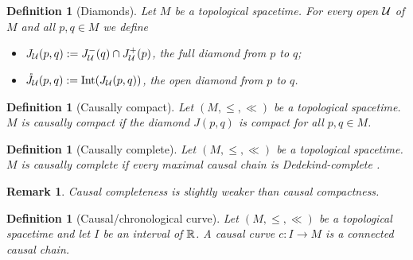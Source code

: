 \documentclass[a4paper,twoside]{article}
\newtheorem{defi}[lem]{Definition}
\newtheorem{rem}[lem]{Remark}
\begin{document}
\begin{defi}[Diamonds]
Let $M$ be a topological spacetime. For every open $\mathcal{U}$ of $M$ and all $p,q \in M$ we define
\begin{itemize}
\item $J_{\mathcal{U}}(p,q) := J^-_{\mathcal{U}}(q)\cap J^+_{\mathcal{U}}(p)$, the full diamond from $p$ to $q$;
\item $\ring{J}_\U(p,q): = \mathrm{Int}(J_\U(p,q))$, the open diamond from $p$ to $q$.
\end{itemize}
\end{defi}

\begin{defi}[Causally compact]
Let $(M,\leq,\ll)$ be a topological spacetime. $M$ is causally compact if the diamond $J(p,q)$ is compact for all $p,q\in M$.
\end{defi}
\begin{defi}[Causally complete]
Let $(M,\leq,\ll)$ be a topological spacetime. $M$ is causally complete if every maximal causal chain is Dedekind-complete \cite{MR1631533}.
\end{defi}
\begin{rem}
Causal completeness is slightly weaker than causal compactness.
\end{rem}

\begin{defi}[Causal/chronological curve] Let $(M,\leq,\ll)$ be a topological spacetime and let $I$ be an interval of $\mathbb R$. A causal curve $c:I\rightarrow M$ is a connected causal chain.
\end{defi}
\end{document}
